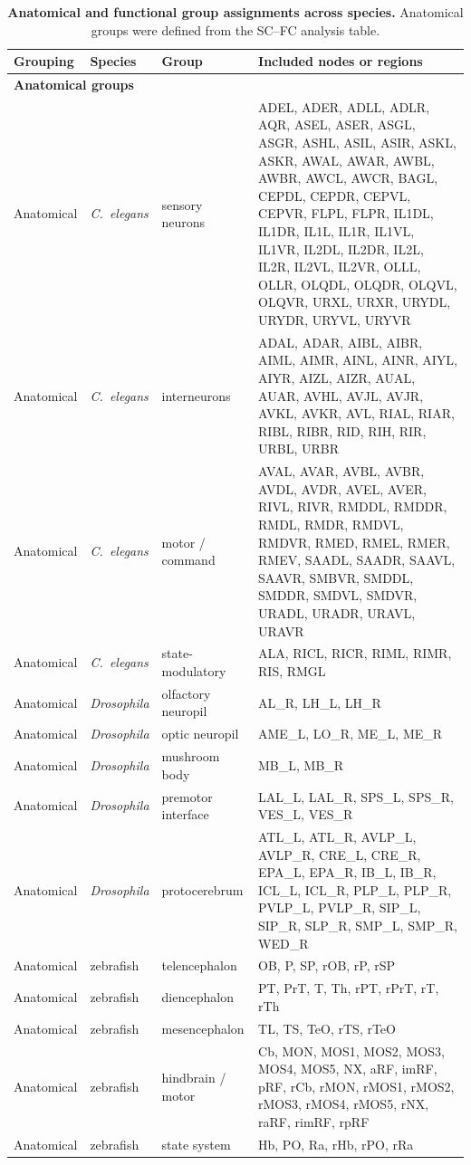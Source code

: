 \documentclass[9pt,twoside]{pnas-new}
\begin{document}
\begin{table}[!ht]
\centering
\scriptsize
\caption{
\textbf{Anatomical and functional group assignments across species.}
Anatomical groups were defined from the SC--FC analysis table.}
\label{tab:species_group_assignments}
\begin{tabularx}{\linewidth}{lllX}
\toprule
Grouping & Species & Group & Included nodes or regions \\
\midrule
\multicolumn{4}{l}{\textbf{Anatomical groups}} \\
\midrule
Anatomical & \textit{C.~elegans} & sensory neurons & ADEL, ADER, ADLL, ADLR, AQR, ASEL, ASER, ASGL, ASGR, ASHL, ASIL, ASIR, ASKL, ASKR, AWAL, AWAR, AWBL, AWBR, AWCL, AWCR, BAGL, CEPDL, CEPDR, CEPVL, CEPVR, FLPL, FLPR, IL1DL, IL1DR, IL1L, IL1R, IL1VL, IL1VR, IL2DL, IL2DR, IL2L, IL2R, IL2VL, IL2VR, OLLL, OLLR, OLQDL, OLQDR, OLQVL, OLQVR, URXL, URXR, URYDL, URYDR, URYVL, URYVR \\
Anatomical & \textit{C.~elegans} & interneurons & ADAL, ADAR, AIBL, AIBR, AIML, AIMR, AINL, AINR, AIYL, AIYR, AIZL, AIZR, AUAL, AUAR, AVHL, AVJL, AVJR, AVKL, AVKR, AVL, RIAL, RIAR, RIBL, RIBR, RID, RIH, RIR, URBL, URBR \\
Anatomical & \textit{C.~elegans} & motor / command & AVAL, AVAR, AVBL, AVBR, AVDL, AVDR, AVEL, AVER, RIVL, RIVR, RMDDL, RMDDR, RMDL, RMDR, RMDVL, RMDVR, RMED, RMEL, RMER, RMEV, SAADL, SAADR, SAAVL, SAAVR, SMBVR, SMDDL, SMDDR, SMDVL, SMDVR, URADL, URADR, URAVL, URAVR \\
Anatomical & \textit{C.~elegans} & state-modulatory & ALA, RICL, RICR, RIML, RIMR, RIS, RMGL \\

Anatomical & \textit{Drosophila} & olfactory neuropil & AL\_R, LH\_L, LH\_R \\
Anatomical & \textit{Drosophila} & optic neuropil & AME\_L, LO\_R, ME\_L, ME\_R \\
Anatomical & \textit{Drosophila} & mushroom body & MB\_L, MB\_R \\
Anatomical & \textit{Drosophila} & premotor interface & LAL\_L, LAL\_R, SPS\_L, SPS\_R, VES\_L, VES\_R \\
Anatomical & \textit{Drosophila} & protocerebrum & ATL\_L, ATL\_R, AVLP\_L, AVLP\_R, CRE\_L, CRE\_R, EPA\_L, EPA\_R, IB\_L, IB\_R, ICL\_L, ICL\_R, PLP\_L, PLP\_R, PVLP\_L, PVLP\_R, SIP\_L, SIP\_R, SLP\_R, SMP\_L, SMP\_R, WED\_R \\

Anatomical & zebrafish & telencephalon & OB, P, SP, rOB, rP, rSP \\
Anatomical & zebrafish & diencephalon & PT, PrT, T, Th, rPT, rPrT, rT, rTh \\
Anatomical & zebrafish & mesencephalon & TL, TS, TeO, rTS, rTeO \\
Anatomical & zebrafish & hindbrain / motor & Cb, MON, MOS1, MOS2, MOS3, MOS4, MOS5, NX, aRF, imRF, pRF, rCb, rMON, rMOS1, rMOS2, rMOS3, rMOS4, rMOS5, rNX, raRF, rimRF, rpRF \\
Anatomical & zebrafish & state system & Hb, PO, Ra, rHb, rPO, rRa \\


\end{tabularx}
\end{table}
\end{document}
